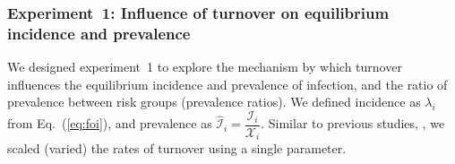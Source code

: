 \subsubsection{Experiment~1: Influence of turnover on equilibrium incidence and prevalence}
\label{sss:exp-prev-inc}
We designed experiment~1 to explore the mechanism by which turnover influences
the equilibrium incidence and prevalence of infection, and the ratio of prevalence between risk groups (prevalence ratios).		%
We defined incidence as $\lambda_i$ from Eq.~(\ref{eq:foi}), and
prevalence as $\hat{\mathcal{I}}_i = \dfrac{\mathcal{I}_i}{\mathcal{X}_i}$.
Similar to previous studies, \citep{Zhang2012,Henry2015},		%
we scaled (varied) the rates of turnover using a single parameter.

